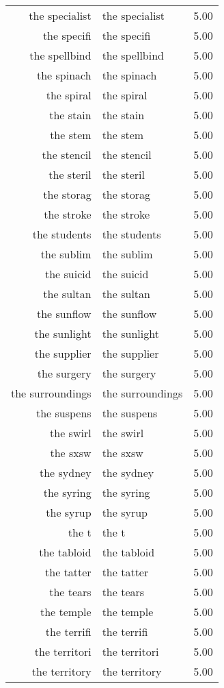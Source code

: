 \begin{table}[ht]
\begin{tabular}{rlr}
  the specialist & the specialist & 5.00 \\ 
  the specifi & the specifi & 5.00 \\ 
  the spellbind & the spellbind & 5.00 \\ 
  the spinach & the spinach & 5.00 \\ 
  the spiral & the spiral & 5.00 \\ 
  the stain & the stain & 5.00 \\ 
  the stem & the stem & 5.00 \\ 
  the stencil & the stencil & 5.00 \\ 
  the steril & the steril & 5.00 \\ 
  the storag & the storag & 5.00 \\ 
  the stroke & the stroke & 5.00 \\ 
  the students & the students & 5.00 \\ 
  the sublim & the sublim & 5.00 \\ 
  the suicid & the suicid & 5.00 \\ 
  the sultan & the sultan & 5.00 \\ 
  the sunflow & the sunflow & 5.00 \\ 
  the sunlight & the sunlight & 5.00 \\ 
  the supplier & the supplier & 5.00 \\ 
  the surgery & the surgery & 5.00 \\ 
  the surroundings & the surroundings & 5.00 \\ 
  the suspens & the suspens & 5.00 \\ 
  the swirl & the swirl & 5.00 \\ 
  the sxsw & the sxsw & 5.00 \\ 
  the sydney & the sydney & 5.00 \\ 
  the syring & the syring & 5.00 \\ 
  the syrup & the syrup & 5.00 \\ 
  the t & the t & 5.00 \\ 
  the tabloid & the tabloid & 5.00 \\ 
  the tatter & the tatter & 5.00 \\ 
  the tears & the tears & 5.00 \\ 
  the temple & the temple & 5.00 \\ 
  the terrifi & the terrifi & 5.00 \\ 
  the territori & the territori & 5.00 \\ 
  the territory & the territory & 5.00 \\ 

\end{tabular}
\end{table}
